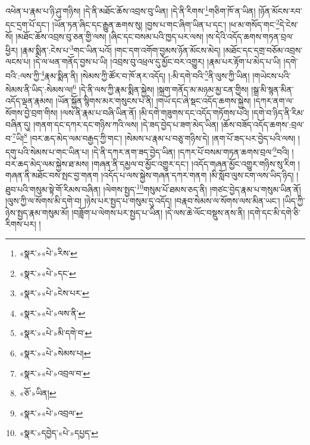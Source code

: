 འཕེན་པ་རྣམ་པ་ཉི་ཤུ་གཉིས། །དེ་ནི་མཐོང་ཆོས་འབྲས་བུ་ཡིན། །དེ་ནི་རིགས་\footnote{«སྣར་»«པེ་»རིས་}གཅིག་ཁོ་ན་ཡིན། །ཉོན་མོངས་རབ་དང་དྲག་པོ་དང་། །ཡོན་ཏན་ཞིང་དང་རྒྱུན་ཆགས་སུ། །བྱས་པ་གང་ཞིག་ཡིན་པ་དང་། །ཕ་མ་གསོད་གང་\footnote{«སྣར་»«པེ་»དང་}དེ་ངེས་སོ། །མཐོང་ཆོས་འབྲས་བུ་ཅན་གྱི་ལས། །ཞིང་དང་བསམ་པའི་ཁྱད་པར་ལས། །ས་དེའི་འདོད་ཆགས་གཏན་བྲལ་ཕྱིར། །རྣམ་སྨིན་:ངེས་པ་\footnote{«སྣར་»«པེ་»ངེས་པར་}གང་ཡིན་པའོ། །གང་དག་འགོག་བྱམས་ཉོན་མོངས་མེད། །མཐོང་དང་དགྲ་བཅོམ་འབྲས་ལངས་པ། །དེ་ལ་ཕན་གནོད་བྱས་པ་ཡི། །འབྲས་བུ་འཕྲལ་དུ་མྱོང་བར་འགྱུར། །རྣམ་པར་རྟོག་པ་མེད་པ་ཡི། །དགེ་བའི་:ལས་ཀྱི་\footnote{«སྣར་»«པེ་»ལས་ནི་}རྣམ་སྨིན་ནི། །སེམས་ཀྱི་ཚོར་བ་ཁོ་ནར་འདོད། །:མི་དགེ་བའི་\footnote{«སྣར་»«པེ་»མི་དགེ་བ་}ནི་ལུས་ཀྱི་ཡིན། །གཡེངས་པའི་སེམས་ནི་ཡིད་:སེམས་ལ།\footnote{«སྣར་»«པེ་»སེམས་པ།} །དེ་ནི་ལས་ཀྱི་རྣམ་སྨིན་སྐྱེས། །སྐྲག་གནོད་མ་མཉམ་མྱ་ངན་གྱིས། །སྒྲ་མི་སྙན་མིན་འདོད་ལྡན་རྣམས། །ཡོན་སྐྱོན་སྙིགས་མར་གསུངས་པ་ནི། །གཡོ་དང་ཞེ་སྡང་འདོད་ཆགས་སྐྱེས། །དཀར་ནག་ལ་སོགས་བྱེ་བྲག་གིས། །ལས་ནི་རྣམ་པ་བཞི་ཡིན་ནོ། །མི་དགེ་གཟུགས་དང་འདོད་གཏོགས་པའི། །དགེ་བ་ཉིད་ནི་རིམ་བཞིན་དུ། །གནག་དང་དཀར་དང་གཉིས་ཀའི་ལས། །དེ་ཟད་བྱེད་པ་ཟག་མེད་ཡིན། །ཆོས་བཟོད་འདོད་ཆགས་:བྲལ་བ་\footnote{«སྣར་»«པེ་»འབྲལ་བ་}ཡི།\footnote{«ཅོ་»ཡིན།} །བར་ཆད་མེད་ལམ་བརྒྱད་ཀྱི་གང་། །སེམས་པ་རྣམ་པ་བཅུ་གཉིས་དེ། །ནག་པོ་ཟད་པར་བྱེད་པའི་ལས། །དགུ་པའི་སེམས་པ་གང་ཡིན་པ། །དེ་ནི་དཀར་ནག་ཟད་བྱེད་ཡིན། །དཀར་པོ་བསམ་གཏན་ཆགས་བྲལ་\footnote{«སྣར་»«པེ་»འབྲལ་}བའི། །བར་ཆད་མེད་ལམ་སྐྱེས་ཐ་མས། །གཞན་ནི་དམྱལ་བ་མྱོང་འགྱུར་དང་། །འདོད་གཞན་མྱོང་འགྱུར་གཉིས་སུ་རིག །གཞན་ནི་མཐོང་བས་སྤང་བྱ་གནག །འདོད་པ་ལས་སྐྱེས་གཞན་དཀར་གནག །མི་སློབ་ལུས་ངག་ལས་ཡིད་ཉིད། །ཐུབ་པའི་གསུམ་སྟེ་གོ་རིམས་བཞིན། །ལེགས་སྤྱད་\footnote{«སྣར་»དབྱེད་«པེ་»དཔྱད་}གསུམ་པོ་ཐམས་ཅད་ནི། །གཙང་བྱེད་རྣམ་པ་གསུམ་ཡིན་ནོ། །ལུས་ཀྱི་ལ་སོགས་མི་དགེ་བ། །ཉེས་པར་སྤྱད་པ་གསུམ་དུ་འདོད། །བརྣབ་སེམས་ལ་སོགས་ལས་མིན་ཡང་། །ཡིད་ཀྱི་ཉེས་སྤྱད་རྣམ་གསུམ་མོ། །བཟློག་པ་ལེགས་པར་སྤྱད་པ་ཡིན། །དེ་ལས་ཆེ་ལོང་བསྡུས་ནས་ནི། །དགེ་དང་མི་དགེ་ཅི་རིགས་པར། །
